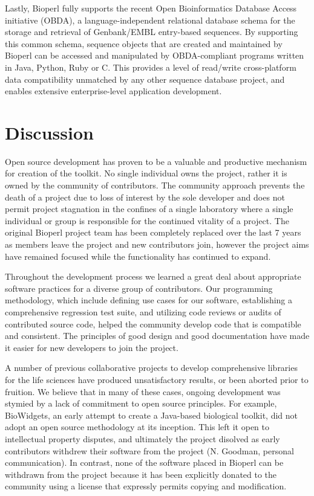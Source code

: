 \documentclass[12pt]{article}
\begin{document}
Lastly, Bioperl fully supports the recent Open Bioinformatics Database
Access initiative (OBDA), a language-independent relational database
schema for the storage and retrieval of Genbank/EMBL entry-based
sequences.  By supporting this common schema, sequence objects that
are created and maintained by Bioperl can be accessed and manipulated
by OBDA-compliant programs written in Java, Python, Ruby or C.  This
provides a level of read/write cross-platform data compatibility
unmatched by any other sequence database project, and enables
extensive enterprise-level application development.

\section{Discussion}

Open source development has proven to be a valuable and productive
mechanism for creation of the toolkit.  No single individual owns the
project, rather it is owned by the community of contributors.  The
community approach prevents the death of a project due to loss of
interest by the sole developer and does not permit project stagnation
in the confines of a single laboratory where a single individual or
group is responsible for the continued vitality of a project.  The
original Bioperl project team has been completely replaced over the
last 7 years as members leave the project and new contributors join,
however the project aims have remained focused while the
functionality has continued to expand.

Throughout the development process we learned a great deal about
appropriate software practices for a diverse group of contributors.
Our programming methodology, which include defining use cases for
our software, establishing a comprehensive regression test suite, and
utilizing code reviews or audits of contributed source code, helped
the community develop code that is compatible and consistent.  The
principles of good design and good documentation have made it easier
for new developers to join the project.

A number of previous collaborative projects to develop comprehensive
libraries for the life sciences have produced unsatisfactory results,
or been aborted prior to fruition.  We believe that in many of these
cases, ongoing development was stymied by a lack of commitment to open
source principles.  For example, BioWidgets, an early attempt to
create a Java-based biological toolkit, did not adopt an open source
methodology at its inception.  This left it open to intellectual
property disputes, and ultimately the project disolved as early
contributors withdrew their software from the project (N. Goodman,
personal communication).  In contrast, none of the software placed in
Bioperl can be withdrawn from the project because it has been
explicitly donated to the community using a license that expressly
permits copying and modification.
\end{document}
